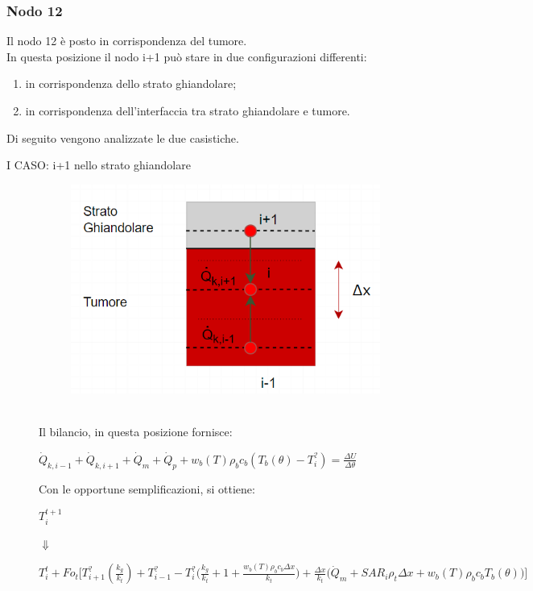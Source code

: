 \subsubsection*{Nodo 12}
Il nodo 12 è posto in corrispondenza del tumore.\\
In questa posizione il nodo i+1 può stare in due configurazioni differenti:
\begin{enumerate}
    \item in corrispondenza dello strato ghiandolare;
    \item in corrispondenza dell'interfaccia tra strato ghiandolare e tumore.
\end{enumerate}
Di seguito vengono analizzate le due casistiche.
\begin{description}
    

\item[I CASO: i+1 nello strato ghiandolare]

     \begin{figure}[H]
    \centering
    \includegraphics[width=.6\textwidth]{Immagini/Nodi/nodo12.1.png} 
    \label{nodo12.1}
\end{figure}

\noindent
\\Il bilancio, in questa posizione fornisce:
\begin{center}
	$ \Dot{Q} _{k, i-1} +\Dot{Q} _{k, i+1}+ \Dot{Q} _{m} +\Dot{Q} _{p}+ w_b (T) \rho _b c_b (T_b(\theta)-T_i ^?)= \frac{\Delta U}{\Delta \theta} $
\end{center}
Con le opportune semplificazioni, si ottiene:
\begin{center}
	$T_i ^{t+1} $
\end{center}
\begin{center}
	$\Downarrow$
\end{center}
\begin{center}
	$T_i ^t + Fo_{t} \Bigg[ T_{i+1} ^? (\frac{k_{g}}{k_t}) + T_{i-1} ^?- T_i ^? \Big(\frac{k_{g}}{k_t} + 1 + \frac{ w_b (T) \rho _b c_b \Delta x }{k_{t}} \Big) + \frac{\Delta x }{k_{t}} \Big(\Dot{Q} _{m} +  SAR_i \rho _{t} \Delta x + w_b (T) \rho _b c_b T_b(\theta)\Big) \Bigg]$
\end{center}


\end{description}
